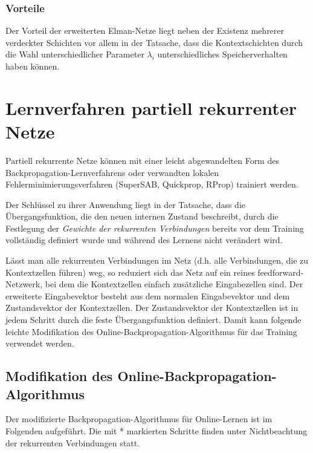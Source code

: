 \subsubsection*{Vorteile}
Der Vorteil der erweiterten Elman-Netze liegt neben der Existenz mehrerer
verdeckter Schichten vor allem in der Tatsache, dass die Kontextschichten durch die Wahl unterschiedlicher Parameter $\lambda_i$ unterschiedliches Speicherverhalten haben können.



\section*{Lernverfahren partiell rekurrenter Netze}
Partiell rekurrente Netze können mit einer leicht abgewandelten Form des Backpropagation-Lernverfahrens oder verwandten lokalen Fehlerminimierungsverfahren (SuperSAB, Quickprop, RProp) trainiert werden.

Der Schlüssel zu ihrer Anwendung liegt in der Tatsache, dass die Übergangsfunktion, die den neuen internen Zustand beschreibt, durch die Festlegung der \emph{Gewichte der rekurrenten Verbindungen} bereits vor dem Training vollständig definiert wurde und während des Lernens nicht verändert wird.

Lässt man alle rekurrenten Verbindungen im Netz (d.h. alle Verbindungen, die zu Kontextzellen führen) weg, so reduziert sich das Netz auf ein reines feedforward-Netzwerk, bei dem die Kontextzellen einfach zusätzliche Eingabezellen sind.
Der erweiterte Eingabevektor besteht aus dem normalen Eingabevektor und dem Zustandsvektor der Kontextzellen. Der Zustandsvektor der Kontextzellen ist in jedem Schritt durch die feste Übergangsfunktion definiert. Damit kann folgende leichte Modifikation des Online-Backpropagation-Algorithmus für das Training verwendet werden.

\subsection*{Modifikation des Online-Backpropagation-Algorithmus}
Der modifizierte Backpropagation-Algorithmus für Online-Lernen ist im Folgenden aufgeführt. Die mit * markierten Schritte finden unter Nichtbeachtung der rekurrenten Verbindungen statt.

